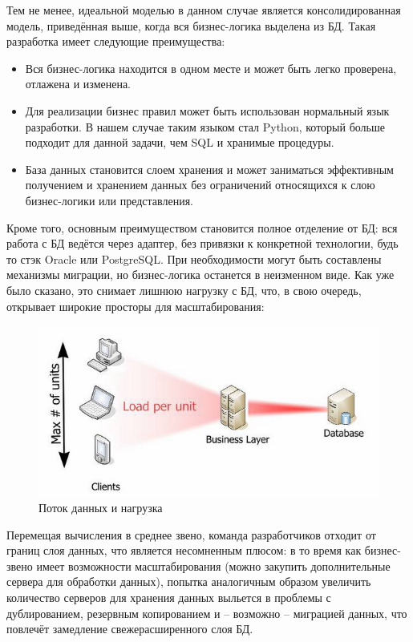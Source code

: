 \documentclass[a4paper, 14pt]{extarticle}
\begin{document}
Тем не менее, идеальной моделью в данном случае является консолидированная модель, приведённая выше, когда вся бизнес-логика выделена из БД. Такая разработка имеет следующие преимущества:

\begin{itemize}
  \item Вся бизнес-логика находится в одном месте и может быть легко проверена, отлажена и изменена.
  \item Для реализации бизнес правил может быть использован нормальный язык разработки. В нашем случае таким языком стал Python, который больше подходит для данной задачи, чем SQL и хранимые процедуры.
  \item База данных становится слоем хранения и может заниматься эффективным получением и хранением данных без ограничений относящихся к слою бизнес-логики или представления.
\end{itemize}

Кроме того, основным преимуществом становится полное отделение от БД: вся работа с БД ведётся через адаптер, без привязки к конкретной технологии, будь то стэк Oracle или PostgreSQL. При необходимости могут быть составлены механизмы миграции, но бизнес-логика останется в неизменном виде. Как уже было сказано, это снимает лишнюю нагрузку с БД, что, в свою очередь, открывает широкие просторы для масштабирования:

\begin{figure}[!htb]
  \centering
    \includegraphics[scale=0.5]{../shared_images/business-logic/scaling.jpg}
   \caption{Поток данных и нагрузка}
    \label{fig:start}
\end{figure}

Перемещая вычисления в среднее звено, команда разработчиков отходит от границ слоя данных, что является несомненным плюсом: в то время как бизнес-звено имеет возможности масштабирования (можно закупить дополнительные сервера для обработки данных), попытка аналогичным образом увеличить количество серверов для хранения данных выльется в проблемы с дублированием, резервным копированием и -- возможно -- миграцией данных, что повлечёт замедление свежерасширенного слоя БД.
\end{document}
